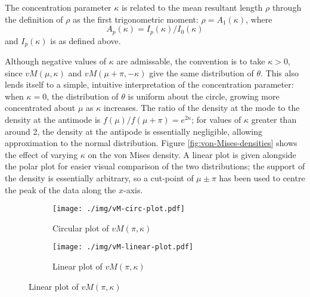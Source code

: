 \documentclass[../../ArchStats.tex]{subfiles}
\begin{document}
The concentration parameter $\kappa$ is related to the mean resultant length $\rho$ through the definition of $\rho$ as the first trigonometric moment: $\rho = A_1(\kappa)$, where
	\begin{equation}
	A_p(\kappa) = I_p(\kappa)/I_0(\kappa)
	\end{equation}
and $I_p(\kappa)$ is as defined above.

Although negative values of $\kappa$ are admissable, the convention is to take $\kappa > 0$, since $vM(\mu, \kappa)$ and $vM(\mu + \pi, -\kappa)$ give the same distribution of $\theta$. This also lends itself to a simple, intuitive interpretation of the concentration parameter: when $\kappa = 0$, the distribution of $\theta$ is uniform about the circle, growing more concentrated about $\mu$ as $\kappa$ increases.  The ratio of the density at the mode to the density at the antimode is $f(\mu) / f(\mu + \pi) = e^{2\kappa}$; for values of $\kappa$ greater than around 2, the density at the antipode is essentially negligible, allowing approximation to the normal distribution. Figure \ref{fig:von-Mises-densities} shows the effect of varying $\kappa$ on the von Mises density. A linear plot is given alongside the polar plot for easier visual comparison of the two distributions; the support of the density is essentially arbitrary, so a cut-point of $\mu \pm \pi$ has been used to centre the peak of the data along the $x$-axis.
 
\begin{figure}[!h]
\centering
\caption{von Mises densities with $\mu = \pi$ and varying $\kappa$.}
\label{fig:von-Mises-densities}
%
\begin{subfigure}[t]{0.4\textwidth}
\centering
\caption{Circular plot of $vM(\pi, \kappa)$}
\texttt{[image: ./img/vM-circ-plot.pdf]}
\end{subfigure}
%
\begin{subfigure}[t]{0.4\textwidth}
\centering
\caption{Linear plot of $vM(\pi, \kappa)$}
\texttt{[image: ./img/vM-linear-plot.pdf]}
\end{subfigure}
%
\end{figure}

\end{document}
